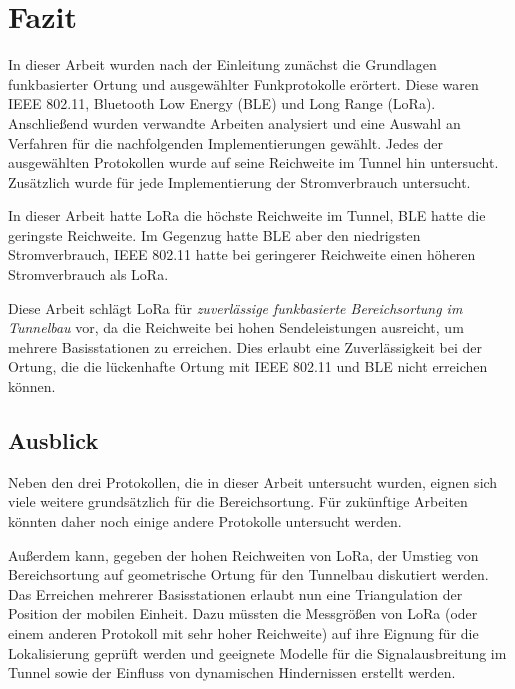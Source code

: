 \chapter{Fazit}
\label{ch:Fazit}
In dieser Arbeit wurden nach der Einleitung zunächst die Grundlagen funkbasierter Ortung und ausgewählter Funkprotokolle erörtert.
Diese waren IEEE 802.11, Bluetooth Low Energy (BLE) und Long Range (LoRa).
Anschließend wurden verwandte Arbeiten analysiert und eine Auswahl an Verfahren für die nachfolgenden Implementierungen gewählt.
Jedes der ausgewählten Protokollen wurde auf seine Reichweite im Tunnel hin untersucht.
Zusätzlich wurde für jede Implementierung der Stromverbrauch untersucht.

In dieser Arbeit hatte LoRa die höchste Reichweite im Tunnel, BLE hatte die geringste Reichweite.
Im Gegenzug hatte BLE aber den niedrigsten Stromverbrauch, IEEE 802.11 hatte bei geringerer Reichweite einen höheren Stromverbrauch als LoRa.

Diese Arbeit schlägt LoRa für \emph{zuverlässige funkbasierte Bereichsortung im Tunnelbau} vor, da die Reichweite bei hohen Sendeleistungen ausreicht, um mehrere Basisstationen zu erreichen.
Dies erlaubt eine Zuverlässigkeit bei der Ortung, die die lückenhafte Ortung mit IEEE 802.11 und BLE nicht erreichen können.

\section{Ausblick}
Neben den drei Protokollen, die in dieser Arbeit untersucht wurden, eignen sich viele weitere grundsätzlich für die Bereichsortung.
Für zukünftige Arbeiten könnten daher noch einige andere Protokolle untersucht werden.

Außerdem kann, gegeben der hohen Reichweiten von LoRa, der Umstieg von Bereichsortung auf geometrische Ortung für den Tunnelbau diskutiert werden.
Das Erreichen mehrerer Basisstationen erlaubt nun eine Triangulation der Position der mobilen Einheit.
Dazu müssten die Messgrößen von LoRa (oder einem anderen Protokoll mit sehr hoher Reichweite) auf ihre Eignung für die Lokalisierung geprüft werden und geeignete Modelle für die Signalausbreitung im Tunnel sowie der Einfluss von dynamischen Hindernissen erstellt werden.
